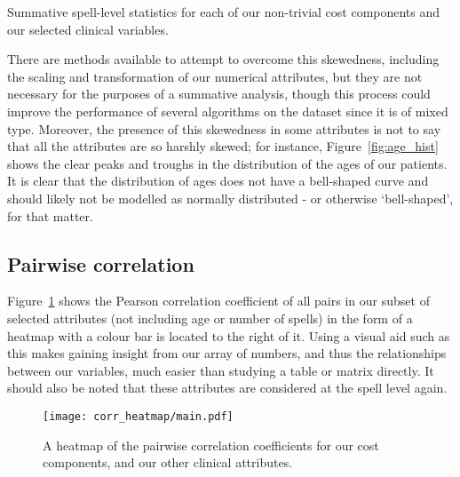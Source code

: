 \begin{table}[h!]
    \resizebox{\textwidth}{!}{%
        
    }
    \resizebox{\textwidth}{!}{%
        
    }
    \resizebox{\textwidth}{!}{%
        
    }
    \caption{Summative spell-level statistics for each of our non-trivial cost
    components and our selected clinical variables.}\label{tab:summative}
\end{table}

There are methods available to attempt to overcome this skewedness, including
the scaling and transformation of our numerical attributes, but they are not
necessary for the purposes of a summative analysis, though this process could
improve the performance of several algorithms on the dataset since it is of
mixed type. Moreover, the presence of this skewedness in some attributes is not
to say that all the attributes are so harshly skewed; for instance,
Figure~\ref{fig:age_hist} shows the clear peaks and troughs in the distribution
of the ages of our patients. It is clear that the distribution of ages does not
have a bell-shaped curve and should likely not be modelled as normally
distributed \-- or otherwise `bell-shaped', for that matter.

\subsection{Pairwise correlation}\label{subsec:corr}

Figure~\ref{fig:corr_heatmap} shows the Pearson correlation coefficient of all
pairs in our subset of selected attributes (not including age or number of
spells) in the form of a heatmap with a colour bar is located to the right of
it. Using a visual aid such as this makes gaining insight from our array of
numbers, and thus the relationships between our variables, much easier than
studying a table or matrix directly. It should also be noted that these
attributes are considered at the spell level again.

\begin{figure}[h!]
    \vspace{-50pt}%
    \texttt{[image: corr\_heatmap/main.pdf]}
    \caption{A heatmap of the pairwise correlation coefficients for our cost
    components, and our other clinical attributes.}\label{fig:corr_heatmap}
\end{figure}

